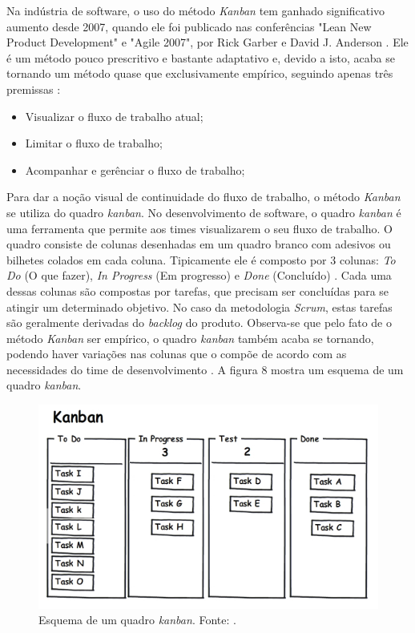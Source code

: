 Na indústria de software, o uso do método \textit{Kanban} tem ganhado significativo aumento desde 2007, quando ele foi publicado nas conferências "Lean New Product Development" e "Agile 2007", por Rick Garber e David J. Anderson \cite{silva2010kanban}. Ele é um método pouco prescritivo e bastante adaptativo e, devido a isto, acaba se tornando um método quase que exclusivamente empírico, seguindo apenas três premissas \cite{silva2010kanban}:

\begin{itemize}
\item Visualizar o fluxo de trabalho atual;
\item Limitar o fluxo de trabalho;
\item Acompanhar e gerênciar o fluxo de trabalho;
\end{itemize}

Para dar a noção visual de continuidade do fluxo de trabalho, o método \textit{Kanban} se utiliza do quadro \textit{kanban}. No desenvolvimento de software, o quadro \textit{kanban} é uma ferramenta que permite aos times visualizarem o seu fluxo de trabalho. O quadro consiste de colunas desenhadas em um quadro branco com adesivos ou bilhetes colados em cada coluna. Tipicamente ele é composto por 3 colunas: \textit{To Do} (O que fazer), \textit{In Progress} (Em progresso) e \textit{Done} (Concluído) \cite{agile2014}. Cada uma dessas colunas são compostas por tarefas, que precisam ser concluídas para se atingir um determinado objetivo. No caso da metodologia \textit{Scrum}, estas tarefas são geralmente derivadas do \textit{backlog} do produto. Observa-se que pelo fato de o método \textit{Kanban} ser empírico, o quadro \textit{kanban} também acaba se tornando, podendo haver variações nas colunas que o compõe de acordo com as necessidades do time de desenvolvimento \cite{agile2014}. A figura 8 mostra um esquema de um quadro \textit{kanban}.

\begin{figure}[!htb]
	\centering
		\includegraphics{figuras/Kanban}
	\caption{Esquema de um quadro \textit{kanban}. Fonte: \cite{kanbanImage}.}
\end{figure}

